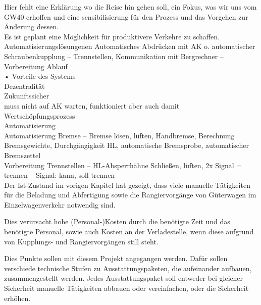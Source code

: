 Hier fehlt eine Erklärung wo die Reise hin gehen soll, ein Fokus, was wir uns vom GW40 erhoffen und eine sensibilisierung für den Prozess und das Vorgehen zur Änderung dessen.\\
Es ist geplant eine Möglichkeit für produktivere Verkehre zu schaffen.\\
Automatisierungslösungenen  Automatisches Abdrücken mit AK o. automatischer Schraubenkupplung – Trennstellen, Kommunikation mit Bergrechner – Vorbereitung Ablauf\\
• Vorteile des Systems\\
Dezentralität\\
Zukunftssicher\\
muss nicht auf AK warten, funktioniert aber auch damit\\
Wertschöpfungsprozess\\
Automatisierung\\
Automatisierung Bremse – Bremse lösen, lüften, Handbremse, Berechnung Bremsgewichte, Durchgängigkeit HL, automatische Bremsprobe, automatischer Bremszettel\\
Vorbereitung Trennstellen – HL-Absperrhähne Schließen, lüften, 2x Signal = trennen – Signal: kann, soll trennen\\
Der Ist-Zustand im vorigen Kapitel hat gezeigt, dass viele manuelle Tätigkeiten für die Beladung und Abfertigung sowie die Rangiervorgänge von Güterwagen im Einzelwagenverkehr notwendig sind.\par
Dies verursacht hohe (Personal-)Kosten durch die benötigte Zeit und das benötigte Personal, sowie auch Kosten an der Verladestelle, wenn diese aufgrund von Kupplungs- und Rangiervorgängen still steht.\par
Dies Punkte sollen mit diesem Projekt angegangen werden. Dafür sollen verschiede technische Stufen zu Ausstattungspaketen, die aufeinander aufbauen, zusammengestellt werden. Jedes Ausstattungspaket soll entweder bei gleicher Sicherheit manuelle Tätigkeiten abbauen oder vereinfachen, oder die Sicherheit erhöhen.\par